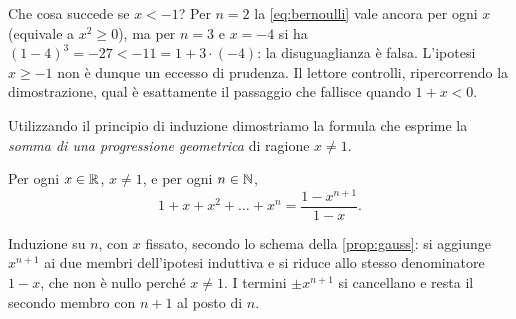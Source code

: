 \begin{marginfigure}
\centering
{}
\caption{La disuguaglianza di Bernoulli per $n=4$: la curva $(1+x)^{4}$ sta sopra la
retta $1+4x$ (sua tangente in $x=0$) per ogni $x\ge-1$.}
\end{marginfigure}

\begin{osservazione}
Che cosa succede se $x<-1$? Per $n=2$ la \eqref{eq:bernoulli} vale ancora per ogni
$x$ (equivale a $x^{2}\ge0$), ma per $n=3$ e $x=-4$ si ha
$(1-4)^{3}=-27<-11=1+3\cdot(-4)$: la disuguaglianza è falsa. L'ipotesi $x\ge-1$ non è
dunque un eccesso di prudenza. Il lettore controlli, ripercorrendo la dimostrazione,
qual è esattamente il passaggio che fallisce quando $1+x<0$.
\end{osservazione}

Utilizzando il principio di induzione dimostriamo la formula che esprime la
\emph{somma di una progressione geometrica} di ragione $x\neq1$.

\begin{proposizione}\label{prop:geometrica}
Per ogni $x\in\mathbb{R}$, $x\neq1$, e per ogni $n\in\mathbb{N}$,
\begin{equation}\label{eq:geometrica}
  1+x+x^{2}+\dots+x^{n}=\frac{1-x^{n+1}}{1-x}.
\end{equation}
\end{proposizione}

\begin{schema}
\end{schema}

\begin{strategia}
Induzione su $n$, con $x$ fissato, secondo lo schema della \cref{prop:gauss}: si
aggiunge $x^{n+1}$ ai due membri dell'ipotesi induttiva e si riduce allo stesso
denominatore $1-x$, che non è nullo perché $x\neq1$. I termini $\pm x^{n+1}$ si
cancellano e resta il secondo membro con $n+1$ al posto di $n$.
\end{strategia}

